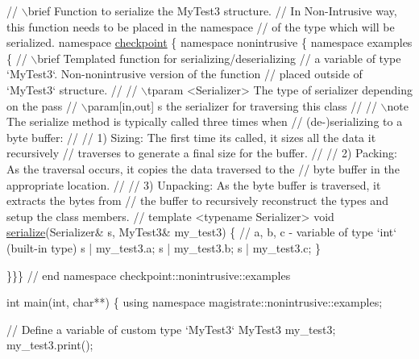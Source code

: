 \begin{DoxyCodeInclude}
{\textcolor{comment}{// \(\backslash\)brief Function to serialize the MyTest3 structure.}
\textcolor{comment}{// In Non-Intrusive way, this function needs to be placed in the namespace}
\textcolor{comment}{// of the type which will be serialized.}
\textcolor{keyword}{namespace }\hyperlink{namespacecheckpoint}{checkpoint} \{ \textcolor{keyword}{namespace }nonintrusive \{ \textcolor{keyword}{namespace }examples \{
  \textcolor{comment}{// \(\backslash\)brief Templated function for serializing/deserializing}
  \textcolor{comment}{// a variable of type `MyTest3`. Non-nonintrusive version of the function}
  \textcolor{comment}{// placed outside of `MyTest3` structure.}
  \textcolor{comment}{//}
  \textcolor{comment}{// \(\backslash\)tparam <Serializer> The type of serializer depending on the pass}
  \textcolor{comment}{// \(\backslash\)param[in,out] s the serializer for traversing this class}
  \textcolor{comment}{//}
  \textcolor{comment}{// \(\backslash\)note The serialize method is typically called three times when}
  \textcolor{comment}{// (de-)serializing to a byte buffer:}
  \textcolor{comment}{//}
  \textcolor{comment}{// 1) Sizing: The first time its called, it sizes all the data it recursively}
  \textcolor{comment}{// traverses to generate a final size for the buffer.}
  \textcolor{comment}{//}
  \textcolor{comment}{// 2) Packing: As the traversal occurs, it copies the data traversed to the}
  \textcolor{comment}{// byte buffer in the appropriate location.}
  \textcolor{comment}{//}
  \textcolor{comment}{// 3) Unpacking: As the byte buffer is traversed, it extracts the bytes from}
  \textcolor{comment}{// the buffer to recursively reconstruct the types and setup the class members.}
  \textcolor{comment}{//}
  \textcolor{keyword}{template} <\textcolor{keyword}{typename} Serializer>
  \textcolor{keywordtype}{void} \hyperlink{namespacecheckpoint_a075da4e7344cf037943362517e606c3a}{serialize}(Serializer& s, MyTest3& my\_test3) \{
    \textcolor{comment}{// a, b, c - variable of type `int` (built-in type)}
    s | my\_test3.a;
    s | my\_test3.b;
    s | my\_test3.c;
  \}

\}\}\} \textcolor{comment}{// end namespace checkpoint::nonintrusive::examples}

\textcolor{keywordtype}{int} main(\textcolor{keywordtype}{int}, \textcolor{keywordtype}{char}**) \{
  \textcolor{keyword}{using namespace }magistrate::nonintrusive::examples;

  \textcolor{comment}{// Define a variable of custom type `MyTest3`}
  MyTest3 my\_test3;
  my\_test3.print();

}
\end{DoxyCodeInclude}
